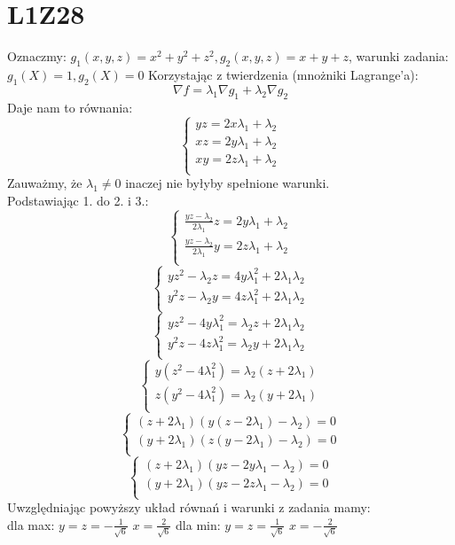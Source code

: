 \documentclass{article}
\begin{document}
\section{L1Z28}
Oznaczmy:
$g_1(x,y,z) = x^2 + y^2 + z^2, g_2(x,y,z) = x+y+z$, warunki zadania: $g_1(X) = 1, g_2(X) = 0$
Korzystając z twierdzenia (mnożniki Lagrange'a):
$$
\nabla f = \lambda_1 \nabla g_1 + \lambda_2 \nabla g_2
$$
Daje nam to równania:
$$
\begin{cases}
yz = 2x\lambda_1 + \lambda_2 \\
xz = 2y\lambda_1 + \lambda_2\\
xy = 2z\lambda_1 + \lambda_2 \\
\end{cases}
$$
Zauważmy, że $\lambda_1 \neq 0$ inaczej nie byłyby spełnione warunki.\\
Podstawiając 1. do 2. i 3.:
$$
\begin{cases}
\frac{yz - \lambda_2}{2\lambda_1}z = 2y\lambda_1 + \lambda_2\\
\frac{yz - \lambda_2}{2\lambda_1}y = 2z\lambda_1 + \lambda_2 \\
\end{cases}
$$
$$
\begin{cases}
yz^2 -\lambda_2z = 4y\lambda_1^2 + 2\lambda_1\lambda_2\\
y^2z -\lambda_2y = 4z\lambda_1^2 + 2\lambda_1\lambda_2\\
\end{cases}
$$
$$
\begin{cases}
yz^2 -4y\lambda_1^2 = \lambda_2z + 2\lambda_1\lambda_2\\
y^2z -4z\lambda_1^2 = \lambda_2y + 2\lambda_1\lambda_2\\
\end{cases}
$$
$$
\begin{cases}
y(z^2 -4\lambda_1^2) = \lambda_2(z + 2\lambda_1)\\
z(y^2 -4\lambda_1^2) = \lambda_2(y + 2\lambda_1)\\
\end{cases}
$$
$$
\begin{cases}
(z + 2\lambda_1) \left(y(z-2\lambda_1) - \lambda_2 \right) = 0 \\
(y + 2\lambda_1) \left(z(y-2\lambda_1) - \lambda_2 \right) = 0 \\
\end{cases}
$$
$$
\begin{cases}
(z + 2\lambda_1) \left(yz - 2y\lambda_1 - \lambda_2 \right) = 0 \\
(y + 2\lambda_1) \left(yz - 2z\lambda_1 - \lambda_2 \right) = 0 \\
\end{cases}
$$
Uwzględniając powyższy układ równań i warunki z zadania mamy:\\
dla max:
$y = z = -\frac{1}{\sqrt{6}}$
$x = \frac{2}{\sqrt{6}}$
dla min:
$y = z = \frac{1}{\sqrt{6}}$
$x = -\frac{2}{\sqrt{6}}$
\end{document}
